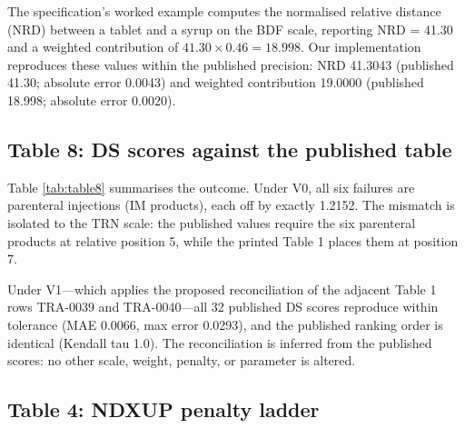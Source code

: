 \documentclass[a4paper]{elsarticle}
\begin{document}
The specification's worked example computes the normalised relative distance (NRD) between a tablet and a syrup on the BDF scale, reporting NRD = 41.30 and a weighted contribution of $41.30 \times 0.46 = 18.998$. Our implementation reproduces these values within the published precision: NRD 41.3043 (published 41.30; absolute error 0.0043) and weighted contribution 19.0000 (published 18.998; absolute error 0.0020).

\subsection{Table 8: DS scores against the published table}
\label{sec:results-table8}

\begin{table}[htbp]
\centering\small
\caption{Reproduction of the 32 published Table 8 DS scores under two scoring modes. Match tolerance: 0.05 (published one-decimal rounding).}
\label{tab:table8}
\end{table}

Table \ref{tab:table8} summarises the outcome. Under V0, all six failures are parenteral injections (IM products), each off by exactly 1.2152. The mismatch is isolated to the TRN scale: the published values require the six parenteral products at relative position 5, while the printed Table 1 places them at position 7.

Under V1---which applies the proposed reconciliation of the adjacent Table 1 rows TRA-0039 and TRA-0040---all 32 published DS scores reproduce within tolerance (MAE 0.0066, max error 0.0293), and the published ranking order is identical (Kendall tau 1.0). The reconciliation is inferred from the published scores: no other scale, weight, penalty, or parameter is altered.

\subsection{Table 4: NDXUP penalty ladder}
\label{sec:results-table4}
\end{document}
